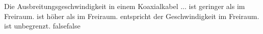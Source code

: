     {Die Ausbreitungsgeschwindigkeit in einem Koaxialkabel ...}
    {ist geringer als im Freiraum.}
    {ist höher als im Freiraum.}
    {entspricht der Geschwindigkeit im Freiraum.}
    {ist unbegrenzt.}
    {false}{false}